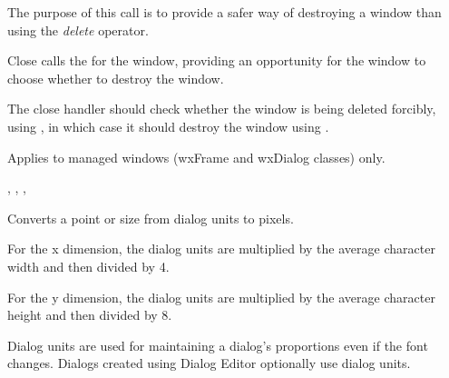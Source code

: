 
\label{wxwindowclose}


The purpose of this call is to provide a safer way of destroying a window than using
the {\it delete} operator.




Close calls the  for the window, providing an opportunity for the window to
choose whether to destroy the window.

The close handler should check whether the window is being deleted forcibly,
using , in which case it should
destroy the window using .

Applies to managed windows (wxFrame and wxDialog classes) only.


,\rtfsp
{},\rtfsp
{},\rtfsp
{}

\label{wxwindowconvertdialogtopixels}



Converts a point or size from dialog units to pixels.

For the x dimension, the dialog units are multiplied by the average character width
and then divided by 4.

For the y dimension, the dialog units are multiplied by the average character height
and then divided by 8.


Dialog units are used for maintaining a dialog's proportions even if the font changes.
Dialogs created using Dialog Editor optionally use dialog units.

